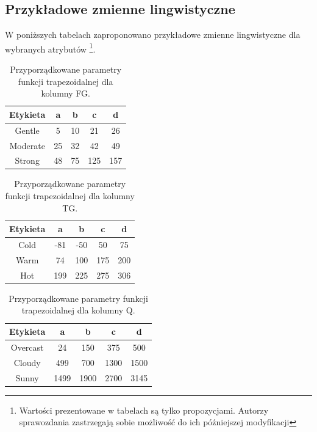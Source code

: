 \documentclass{classrep}
\begin{document}
\subsection{Przykładowe zmienne lingwistyczne}
W poniższych tabelach zaproponowano przykładowe zmienne lingwistyczne dla wybranych atrybutów \footnote{Wartości prezentowane w tabelach są tylko propozycjami. Autorzy sprawozdania zastrzegają sobie możliwość do ich późniejszej modyfikacji}.

\begin{table}[H]
	\centering
	\begin{tabular}{c c c c c} 
		\hline
		\textbf{Etykieta} & \textbf{a} & \textbf{b} & \textbf{c} & \textbf{d}\\ [0.5ex] 
		\hline
		\hline 
Gentle	 & 5 & 10 & 21 & 26 \\
Moderate & 25 & 32 & 42 & 49 \\
Strong	 & 48 & 75 & 125 & 157 \\
		\hline
	\end{tabular}
	\caption{Przyporządkowane parametry funkcji trapezoidalnej dla kolumny FG.}
\end{table}

\begin{table}[H]
	\centering
	\begin{tabular}{c c c c c} 
		\hline
		\textbf{Etykieta} & \textbf{a} & \textbf{b} & \textbf{c} & \textbf{d}\\ [0.5ex] 
		\hline
		\hline 
Cold	 & -81 & -50 & 50 & 75 \\
Warm     & 74 & 100 & 175 & 200 \\
Hot	       & 199 & 225 & 275 & 306 \\
		\hline
	\end{tabular}
	\caption{Przyporządkowane parametry funkcji trapezoidalnej dla kolumny TG.}
\end{table}

\begin{table}[H]
	\centering
	\begin{tabular}{c c c c c} 
		\hline
		\textbf{Etykieta} & \textbf{a} & \textbf{b} & \textbf{c} & \textbf{d}\\ [0.5ex] 
		\hline
		\hline 
Overcast	  & 24 & 150 & 375 & 500 \\
Cloudy     & 499 & 700 & 1300 & 1500 \\
Sunny	  & 1499 & 1900 & 2700 & 3145 \\
		\hline
	\end{tabular}
	\caption{Przyporządkowane parametry funkcji trapezoidalnej dla kolumny Q.}
\end{table}
\end{document}
